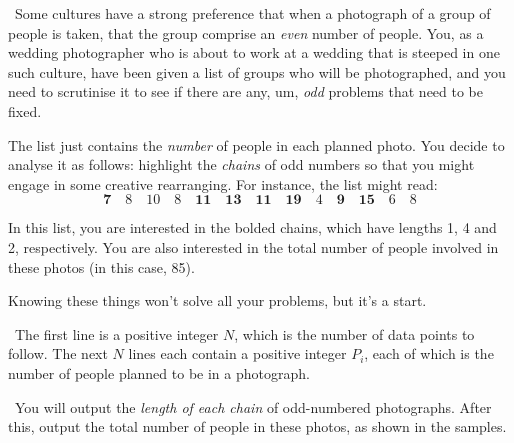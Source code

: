 

\Question\ Some cultures have a strong preference that when a photograph of a group of
people is taken, that the group comprise an \emph{even} number of people. You, as a
wedding photographer who is about to work at a wedding that is steeped in one such
culture, have been given a list of groups who will be photographed, and you need to
scrutinise it to see if there are any, um, \emph{odd} problems that need to be fixed.

The list just contains the \emph{number} of people in each planned photo. You decide to
analyse it as follows: highlight the \emph{chains} of odd numbers so that you might engage
in some creative rearranging. For instance, the list might read: \[
  \mathbf{7}
  \quad 8 \quad 10 \quad 8
  \quad \mathbf{11} \quad \mathbf{13} \quad \mathbf{11} \quad \mathbf{19}
  \quad 4
  \quad \mathbf{9} \quad \mathbf{15}
  \quad 6 \quad 8
\]

In this list, you are interested in the bolded chains, which have lengths 1, 4 and 2,
respectively. You are also interested in the total number of people involved in these
photos (in this case, 85).

Knowing these things won't solve all your problems, but it's a start.

\Input\ The first line is a positive integer $N$, which is the number of data points to
follow. The next $N$ lines each contain a positive integer $P_i$, each of which is the
number of people planned to be in a photograph.

\Output\ You will output the \emph{length of each chain} of odd-numbered photographs.
After this, output the total number of people in these photos, as shown in the samples.

\Sample

